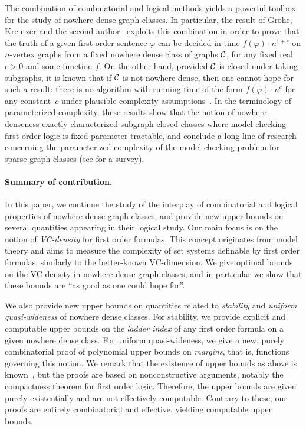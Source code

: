 The combination of combinatorial and logical methods yields a powerful toolbox for the study
of nowhere dense graph classes. In particular, 
the result of Grohe, Kreutzer and the second author~\cite{grohe2014deciding} exploits 
this combination in order to prove that the truth of a given
first order sentence $\varphi$ can be decided in time 
$f(\varphi)\cdot n^{1+\epsilon}$ on $n$-vertex graphs from a fixed nowhere dense class of graphs $\mathcal{C}$, for any fixed real $\epsilon>0$ and some function $f$.
On the other hand, provided $\mathcal{C}$ is closed under taking subgraphs, it is known that if $\mathcal{C}$ is not nowhere dense,
then one cannot hope for such a result: there is no algorithm with running time of the form $f(\varphi)\cdot n^c$ for any constant~$c$ under plausible complexity assumptions~\cite{dvovrak2013testing}.
In the terminology of parameterized complexity, these results show that the notion of nowhere denseness exactly characterized subgraph-closed classes where model-checking first order logic
is fixed-parameter tractable, and conclude a long line of research concerning the parameterized complexity of the model checking problem for sparse graph classes (see \cite{grokre11} for a survey).

\paragraph{Summary of contribution.} In this paper, we continue the study of the 
interplay of combinatorial and logical properties
of nowhere dense graph classes, and provide
new upper bounds on several
quantities appearing in their logical study.
Our main focus is on the notion of \emph{VC-density} for first order formulas. This concept originates from model theory and 
aims to measure the complexity of set systems definable by first order formulas, similarly to the better-known VC-dimension.
We give optimal bounds on the VC-density in nowhere dense graph classes, and in particular we show that these bounds are ``as good as one could hope for''.

We also provide new upper bounds on quantities related to {\em{stability}} and {\em{uniform quasi-wideness}} of nowhere dense classes.
For stability, we provide explicit and computable upper bounds on the \emph{ladder index} of any first order formula on a given nowhere dense class.
For uniform quasi-wideness, we give a new, purely combinatorial proof of polynomial upper bounds on {\em{margins}}, that is, functions governing this notion.
We remark that the existence of upper bounds as above is known~\cite{adler2014interpreting,siebertz2016polynomial}, but the proofs are based on nonconstructive arguments, 
notably the compactness theorem for first order logic. Therefore, the upper bounds are given purely existentially and are not effectively computable.
Contrary to these, our proofs are entirely combinatorial and effective, yielding computable upper bounds.

